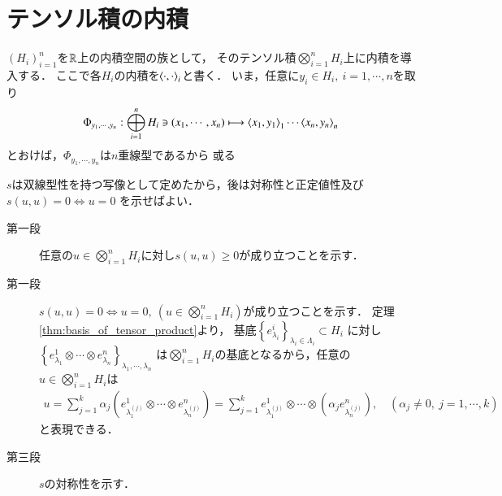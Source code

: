 \section{テンソル積の内積}
	$(H_i)_{i=1}^n$を$\mathbb{R}$上の内積空間の族として，
	そのテンソル積$\bigotimes_{i=1}^n H_i$上に内積を導入する．
	ここで各$H_i$の内積を$\inprod<\cdot,\cdot>_i$と書く．
	いま，任意に$y_i \in H_i,\ i=1,\cdots,n$を取り
	\begin{align}
		\Phi_{y_1,\cdots,y_n}:
		\bigoplus_{i=1}^n H_i \ni (x_1,\cdots,x_n)
		\longmapsto \inprod<x_1,y_1>_1 \cdots \inprod<x_n,y_n>_n
	\end{align}
	とおけば，$\Phi_{y_1,\cdots,y_n}$は$n$重線型であるから
	或る
	
	\begin{screen}
		\begin{thm}
		\end{thm}
	\end{screen}
	
	\begin{prf} $s$は双線型性を持つ写像として定めたから，後は対称性と正定値性及び$s(u,u)=0 \Leftrightarrow u=0$
		を示せばよい．
		\begin{description}
			\item[第一段]
				任意の$u \in \bigotimes_{i=1}^n H_i$に対し$s(u,u) \geq 0$が成り立つことを示す．
				
			\item[第一段]
				$s(u,u)=0 \Leftrightarrow u=0,\ (u \in \bigotimes_{i=1}^n H_i)$が成り立つことを示す．
				定理\ref{thm:basis_of_tensor_product}より，
				基底$\left\{ e^i_{\lambda_i} \right\}_{\lambda_i \in \Lambda_i} \subset H_i$
				に対し$\left\{ e^1_{\lambda_1} \otimes \cdots \otimes e^n_{\lambda_n} \right\}_{\lambda_1,\cdots,\lambda_n}$
				は$\bigotimes_{i=1}^n H_i$の基底となるから，任意の
				$u \in \bigotimes_{i=1}^n H_i$は
				\begin{align}
					u = \sum_{j=1}^k \alpha_j \left( e^1_{\lambda^{(j)}_1} \otimes \cdots \otimes e^n_{\lambda^{(j)}_n} \right)
					= \sum_{j=1}^k e^1_{\lambda^{(j)}_1} \otimes \cdots \otimes \left( \alpha_j e^n_{\lambda^{(j)}_n} \right),
					\quad (\alpha_j \neq 0,\ j=1,\cdots,k)
				\end{align}
				と表現できる．
			
			\item[第三段]
				$s$の対称性を示す．
		\end{description}
	\end{prf}
	
	\begin{screen}
		\begin{dfn}[テンソル積上の内積]
		\end{dfn}
	\end{screen}
	
	\begin{screen}
		\begin{thm}
		\end{thm}
	\end{screen}
	
	\begin{screen}
		\begin{thm}
		\end{thm}
	\end{screen}